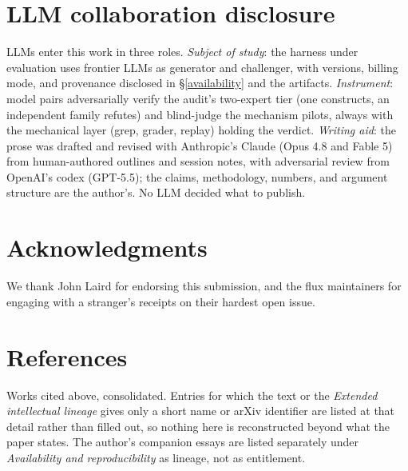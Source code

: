 \documentclass[
  10pt,
]{article}
\begin{document}
\section*{LLM collaboration
disclosure}\label{llm-collaboration-disclosure}

LLMs enter this work in three roles. \emph{Subject of study}: the
harness under evaluation uses frontier LLMs as generator and challenger,
with versions, billing mode, and provenance disclosed in
\S\ref{availability} and the artifacts. \emph{Instrument}: model pairs
adversarially verify the audit's two-expert tier (one constructs, an
independent family refutes) and blind-judge the mechanism pilots, always
with the mechanical layer (grep, grader, replay) holding the verdict.
\emph{Writing aid}: the prose was drafted and revised with Anthropic's
Claude (Opus 4.8 and Fable 5) from human-authored outlines and session
notes, with adversarial review from OpenAI's codex (GPT-5.5); the
claims, methodology, numbers, and argument structure are the author's.
No LLM decided what to publish.

\section*{Acknowledgments}\label{acknowledgments}

We thank John Laird for endorsing this submission, and the flux
maintainers for engaging with a stranger's receipts on their hardest
open issue.

\section*{References}\label{references}

Works cited above, consolidated. Entries for which the text or the
\emph{Extended intellectual lineage} gives only a short name or arXiv
identifier are listed at that detail rather than filled out, so nothing
here is reconstructed beyond what the paper states. The author's
companion essays are listed separately under \emph{Availability and
reproducibility} as lineage, not as entitlement.
\end{document}
